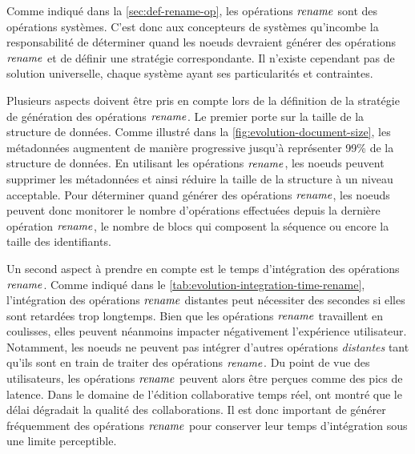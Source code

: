 Comme indiqué dans la \autoref{sec:def-rename-op}, les opérations $\mathit{rename}$ sont des opérations systèmes.
C'est donc aux concepteurs de systèmes qu'incombe la responsabilité de déterminer quand les noeuds devraient générer des opérations $\mathit{rename}$ et de définir une stratégie correspondante.
Il n'existe cependant pas de solution universelle, chaque système ayant ses particularités et contraintes.

Plusieurs aspects doivent être pris en compte lors de la définition de la stratégie de génération des opérations $\mathit{rename}$.
Le premier porte sur la taille de la structure de données.
Comme illustré dans la \autoref{fig:evolution-document-size}, les métadonnées augmentent de manière progressive jusqu'à représenter 99\% de la structure de données.
En utilisant les opérations $\mathit{rename}$, les noeuds peuvent supprimer les métadonnées et ainsi réduire la taille de la structure à un niveau acceptable.
Pour déterminer quand générer des opérations $\mathit{rename}$, les noeuds peuvent donc monitorer le nombre d'opérations effectuées depuis la dernière opération $\mathit{rename}$, le nombre de blocs qui composent la séquence ou encore la taille des identifiants.

Un second aspect à prendre en compte est le temps d'intégration des opérations $\mathit{rename}$.
Comme indiqué dans le \autoref{tab:evolution-integration-time-rename}, l'intégration des opérations $\mathit{rename}$ distantes peut nécessiter des secondes si elles sont retardées trop longtemps.
Bien que les opérations $\mathit{rename}$ travaillent en coulisses, elles peuvent néanmoins impacter négativement l'expérience utilisateur.
Notamment, les noeuds ne peuvent pas intégrer d'autres opérations \emph{distantes} tant qu'ils sont en train de traiter des opérations $\mathit{rename}$.
Du point de vue des utilisateurs, les opérations $\mathit{rename}$ peuvent alors être perçues comme des pics de latence.
Dans le domaine de l'édition collaborative temps réel, \textcite{2014-effect-delay-collaborative-editing-ignat,2015-cope-delay-collaborative-note-taking-ignat} ont montré que le délai dégradait la qualité des collaborations.
Il est donc important de générer fréquemment des opérations $\mathit{rename}$ pour conserver leur temps d'intégration sous une limite perceptible.

